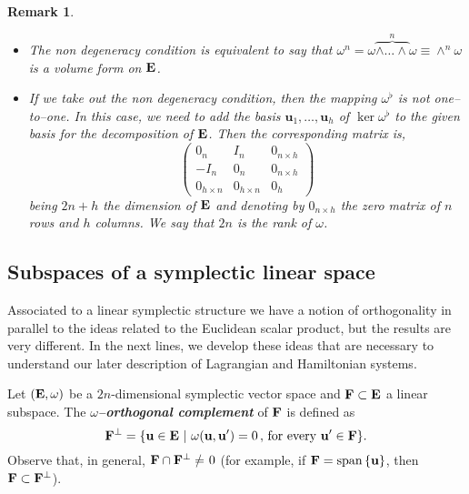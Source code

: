\documentclass[12pt]{report}
\newtheorem{remark}[teor]{Remark}
\renewcommand{\neq}{=\hspace{-3.5mm}/\hspace{2mm}}
\begin{document}
\begin{remark}{\rm  
\begin{itemize}
\item
The non degeneracy condition is equivalent to say that $\omega^{n}=\omega\overbrace{\wedge\ldots\wedge}^{n}\omega\equiv\wedge^n\omega$ is a volume form on ${\bf E}$.
\item
If we take out the non degeneracy condition, then the mapping $\omega^{\flat}$ is not one--to--one. In this case, we need to add the basis $\mathbf{u}_{1},\ldots,\mathbf{u}_{h}$ of $\ker \omega^{\flat}$ to the given basis for the decomposition of ${\bf E}$. Then the corresponding matrix is,
$$
\left(\begin{matrix} 0_n & I_n&0_{n\times h} \\ -I_n & 0_n& 0_{n\times h}\\0_{h\times n} & 0_{h\times n}&0_{h}
\end{matrix}\right)
$$
being $2n+h$ the dimension of ${\bf E}$ and denoting by $0_{n\times h}$ the zero matrix of $n$ rows and $h$ columns. We say that $2n$ is the rank of $\omega$. 
\end{itemize}
}\end{remark}


\subsection{Subspaces of a symplectic linear space}


Associated to a linear symplectic structure we have a notion of orthogonality in parallel to the ideas related to the Euclidean scalar product, but the results are very different. In the next lines, we develop these ideas that are necessary to understand our later description of Lagrangian and Hamiltonian systems.

Let $({\bf E},\omega)$ be a $2n$-dimensional symplectic vector space and ${\bf F}\subset {\bf E}$ a linear subspace. The {\sl \textbf{$\omega$--orthogonal complement}} of ${\bf F}$ is defined as
$$
{\bf F}^\bot=\{{\bf u}\in{\bf E}\ |\ \omega({\bf u},{\bf u}')=0\, , \, \mathrm{for\,\, every}\,\, {\bf u}'\in{\bf F}\}.
$$
Observe that, in general, ${\bf F}\cap{\bf F}^\bot\neq 0$ (for example, if ${\bf F}=\mathrm{span}\,\{{\bf u}\}$, then ${\bf F}\subset{\bf F}^\bot$).
\end{document}
